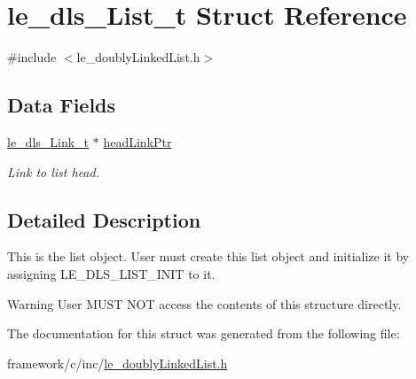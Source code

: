 \hypertarget{structle__dls___list__t}{}\section{le\+\_\+dls\+\_\+\+List\+\_\+t Struct Reference}
\label{structle__dls___list__t}


{\ttfamily \#include $<$le\+\_\+doubly\+Linked\+List.\+h$>$}

\subsection*{Data Fields}
\begin{DoxyCompactItemize}
\item 
\hypertarget{structle__dls___list__t_a830f3082336d0b79e10e6206e2428dda}{}\hyperlink{structle__dls___link__t}{le\+\_\+dls\+\_\+\+Link\+\_\+t} $\ast$ \hyperlink{structle__dls___list__t_a830f3082336d0b79e10e6206e2428dda}{head\+Link\+Ptr}\label{structle__dls___list__t_a830f3082336d0b79e10e6206e2428dda}

\begin{DoxyCompactList}\small\item\em Link to list head. \end{DoxyCompactList}\end{DoxyCompactItemize}


\subsection{Detailed Description}
This is the list object. User must create this list object and initialize it by assigning L\+E\+\_\+\+D\+L\+S\+\_\+\+L\+I\+S\+T\+\_\+\+I\+N\+I\+T to it.

\begin{DoxyWarning}{Warning}
User M\+U\+S\+T N\+O\+T access the contents of this structure directly. 
\end{DoxyWarning}


The documentation for this struct was generated from the following file\+:\begin{DoxyCompactItemize}
\item 
framework/c/inc/\hyperlink{le__doubly_linked_list_8h}{le\+\_\+doubly\+Linked\+List.\+h}\end{DoxyCompactItemize}
